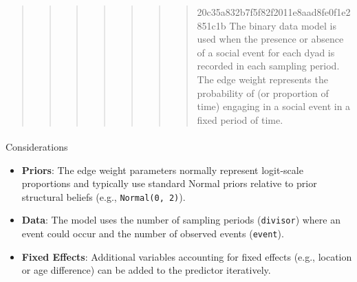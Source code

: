 \documentclass[
  letterpaper,
  DIV=11,
  numbers=noendperiod]{scrartcl}
\makeatletter
\let\oldparagraph\paragraph
\renewcommand{\paragraph}{
    \@ifstar
      \xxxParagraphStar
      \xxxParagraphNoStar
  }
\newcommand{\xxxParagraphStar}[1]{\oldparagraph*{#1}\mbox{}}
\newcommand{\xxxParagraphNoStar}[1]{\oldparagraph{#1}\mbox{}}
\providecommand{\tightlist}{%
  \setlength{\itemsep}{0pt}\setlength{\parskip}{0pt}}
\makeatother
\begin{document}
\begin{quote}
\begin{quote}
\begin{quote}
\begin{quote}
\begin{quote}
\begin{quote}
\begin{quote}
20c35a832b7f5f82f2011e8aad8fe0f1e2851c1b The binary data model is used
when the presence or absence of a social event for each dyad is recorded
in each sampling period. The edge weight represents the probability of
(or proportion of time) engaging in a social event in a fixed period of
time.
\end{quote}
\end{quote}
\end{quote}
\end{quote}
\end{quote}
\end{quote}
\end{quote}

\paragraph{Considerations}\label{considerations}

\begin{tcolorbox}[enhanced jigsaw, colframe=quarto-callout-note-color-frame, bottomtitle=1mm, coltitle=black, titlerule=0mm, colbacktitle=quarto-callout-note-color!10!white, colback=white, opacitybacktitle=0.6, rightrule=.15mm, toptitle=1mm, opacityback=0, arc=.35mm, left=2mm, title=\textcolor{quarto-callout-note-color}{\faInfo}\hspace{0.5em}{Note}, breakable, bottomrule=.15mm, toprule=.15mm, leftrule=.75mm]

\begin{itemize}
\tightlist
\item
  \textbf{Priors}: The edge weight parameters normally represent
  logit-scale proportions and typically use standard Normal priors
  relative to prior structural beliefs (e.g., \texttt{Normal(0,\ 2)}).
\item
  \textbf{Data}: The model uses the number of sampling periods
  (\texttt{divisor}) where an event could occur and the number of
  observed events (\texttt{event}).
\item
  \textbf{Fixed Effects}: Additional variables accounting for fixed
  effects (e.g., location or age difference) can be added to the
  predictor iteratively.
\end{itemize}

\end{tcolorbox}
\end{document}
